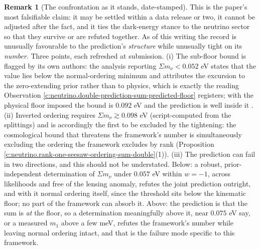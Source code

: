 \documentclass[11pt]{article}
\theoremstyle{definition}
\newtheorem{remark}[theorem]{Remark}
\theoremstyle{plain}
\providecommand{\mnu}{}\renewcommand{\mnu}{\Sigma m_{\nu}}
\begin{document}
\begin{remark}[The confrontation as it stands, date-stamped]\label{c:note.neutrino.confrontation-it-stands-date-stamped}
This is the paper's most falsifiable claim: it may be settled within a data release or two, it cannot be adjusted after the fact, and it ties the dark-energy stance to the neutrino sector so that they survive or are refuted together. As of this writing the record is unusually favourable to the prediction's \emph{structure} while unusually tight on its \emph{number}. Three points, each refreshed at submission. (i) The sub-floor bound is flagged by its own authors: the analysis reporting $\mnu < 0.052$ eV states that the value lies below the normal-ordering minimum and attributes the excursion to the zero-extending prior rather than to physics, which is exactly the reading Observation \ref{c:neutrino.double-prediction-sum-predicted-floor} registers; with the physical floor imposed the bound is $0.092$ eV and the prediction is well inside it \cite{HouWangZhaoZhang2026}. (ii) Inverted ordering requires $\mnu \gtrsim 0.098$ eV (script-computed from the splittings) and is accordingly the first to be excluded by the tightening: the cosmological bound that threatens the framework's number is simultaneously excluding the ordering the framework excludes by rank (Proposition \ref{c:neutrino.rank-one-seesaw-ordering-sum-double}(1)). (iii) The prediction can fail in two directions, and this should not be understated. Below: a robust, prior-independent determination of $\mnu$ under $0.057$ eV within $w = -1$, across likelihoods and free of the lensing anomaly, refutes the joint prediction outright, and with it normal ordering itself, since the threshold sits below the kinematic floor; no part of the framework can absorb it. Above: the prediction is that the sum is \emph{at} the floor, so a determination meaningfully above it, near $0.075$ eV say, or a measured $m_{1}$ above a few meV, refutes the framework's number while leaving normal ordering intact, and that is the failure mode specific to this framework.
\end{remark}
\end{document}
